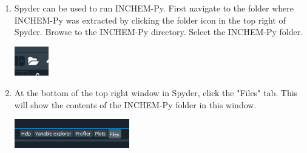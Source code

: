 \documentclass[a4paper]{refart}
\begin{document}
{\begin{minipage}{\fullwidth}
\begin{enumerate}
    \item Spyder can be used to run INCHEM-Py. First navigate to the folder where INCHEM-Py was extracted by clicking the folder icon in the top right of Spyder. Browse to the INCHEM-Py directory. Select the INCHEM-Py folder.
                
            \vspace{1em}
            \begin{minipage}[t]{\linewidth}
                \centering
                \includegraphics[width = 1.5cm]{folder.png}
            \end{minipage}
          
    \item At the bottom of the top right window in Spyder, click the "Files" tab. This will show the contents of the INCHEM-Py folder in this window.
                
            \vspace{1em}
            \begin{minipage}[t]{\linewidth}
                \centering
                \includegraphics[width = 5cm]{files.png}
            \end{minipage}
          
\end{enumerate}
\end{minipage}}
\end{document}

